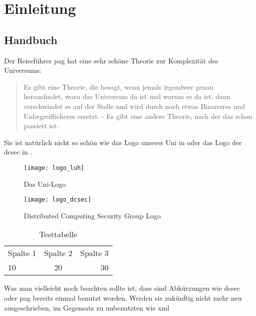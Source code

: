\chapter{Einleitung}
\label{chap:Einleitung}

\section{Handbuch}
\label{sec:Handbuch}
Der Reiseführer \gls{pag} hat eine sehr schöne Theorie zur Komplexität des Universums:

\begin{quote}
Es gibt eine Theorie, die besagt, wenn jemals irgendwer genau herausfindet, wozu das Universum da ist und warum es da ist, dann verschwindet es auf der Stelle und wird durch noch etwas Bizarreres und Unbegreiflicheres ersetzt. - Es gibt eine andere Theorie, nach der das schon passiert ist. \hfill \cite{adams1995hitchhiker}
\end{quote}

Sie ist natürlich nicht so schön wie das Logo unserer Uni in  oder das Logo der \gls{dcsec} in .

\begin{figure}[ht]
\centering
\texttt{[image: logo\_luh]}
\caption[Uni-Logo]{Das Uni-Logo}
\label{fig:uni-logo}
\end{figure}

\begin{figure}[ht]
\centering
\texttt{[image: logo\_dcsec]}
\caption[DCSec-Logo]{Distributed Computing Security Group Logo}
\label{fig:dcsec-logo}
\end{figure}

\begin{table}
\begin{center}
\begin{tabular}{lcr}
  Spalte 1 & Spalte 2 & Spalte 3 \\
  10 & 20 & 30 \\
\end{tabular}
\end{center}
\label{tab:test}
\caption{Testtabelle}
\end{table}

Was man vielleicht noch beachten sollte ist, dass sind Abkürzungen wie \gls{dcsec} oder \gls{pag} bereits einmal benutzt worden. Werden sie zukünftig nicht mehr neu ausgeschrieben, im Gegensatz zu unbenutzten wie \gls{xml}